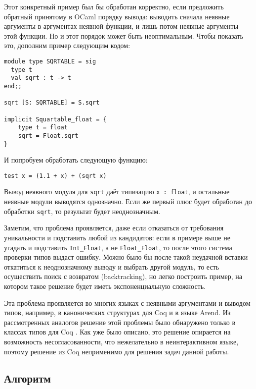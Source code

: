 \documentclass[../diploma.tex]{subfiles}
\begin{document}
Этот конкретный пример был бы обработан корректно, если предложить обратный принятому в OCaml порядку вывода: выводить сначала неявные аргументы в аргументах неявной функции, и лишь потом неявные аргументы этой функции. Но и этот порядок может быть неоптимальным. Чтобы показать это, дополним пример следующим кодом:

\begin{verbatim}
module type SQRTABLE = sig
  type t
  val sqrt : t -> t
end;;

sqrt [S: SQRTABLE] = S.sqrt

implicit Squartable_float = {
    type t = float
    sqrt = Float.sqrt
}
\end{verbatim}

И попробуем обработать следующую функцию:

\begin{verbatim}
test x = (1.1 + x) + (sqrt x)
\end{verbatim}

Вывод неявного модуля для \texttt{sqrt} даёт типизацию \texttt{x : float}, и остальные неявные модули выводятся однозначно. Если же первый плюс будет обработан до обработки \texttt{sqrt}, то результат будет неоднозначным.

Заметим, что проблема проявляется, даже если отказаться от требования уникальности и подставить любой из кандидатов: если в примере выше не угадать и подставить \texttt{Int_Float}, а не \texttt{Float_Float}, то после этого система проверки типов выдаст ошибку. Можно было бы после такой неудачной вставки откатиться к неоднозначному выводу и выбрать другой модуль, то есть осуществить поиск с возвратом (backtracking), но легко построить пример, на котором такое решение будет иметь экспоненциальную сложность.

Эта проблема проявляется во многих языках с неявными аргументами и выводом типов, например, в канонических структурах для Coq и в языке Arend. Из рассмотренных аналогов решение этой проблемы было обнаружено только в классах типов для Coq \cite{coq_typeclasses}. Как уже было описано, это решение опирается на возможность несогласованности, что нежелательно в неинтерактивном языке, поэтому решение из Coq неприменимо для решения задач данной работы.

\subsection{Алгоритм}
\end{document}

